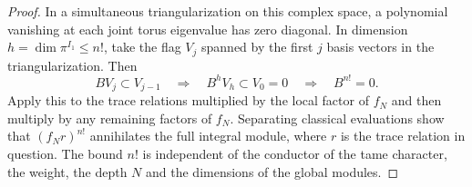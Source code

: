 \begin{proof}
In a simultaneous triangularization on this complex
space, a polynomial vanishing at each joint torus eigenvalue
has zero diagonal. In dimension \(h=\dim\pi^{I_1}\le n!\), take the flag \(V_j\) spanned by the first \(j\) basis vectors in the triangularization. Then
\[
 B V_j\subset V_{j-1}\quad\Longrightarrow\quad
 B^h V_h\subset V_0=0\quad\Longrightarrow\quad B^{n!}=0 .
\] Apply this to the trace relations
multiplied by the local factor of \(f_N\) and then
multiply by any remaining factors of \(f_N\). Separating
classical evaluations show that \((f_N r)^{n!}\)
annihilates the full integral module, where \(r\) is the
trace relation in question. The bound \(n!\) is independent
of the conductor of the tame character, the weight,
the depth \(N\) and the dimensions of the global modules.
\end{proof}
